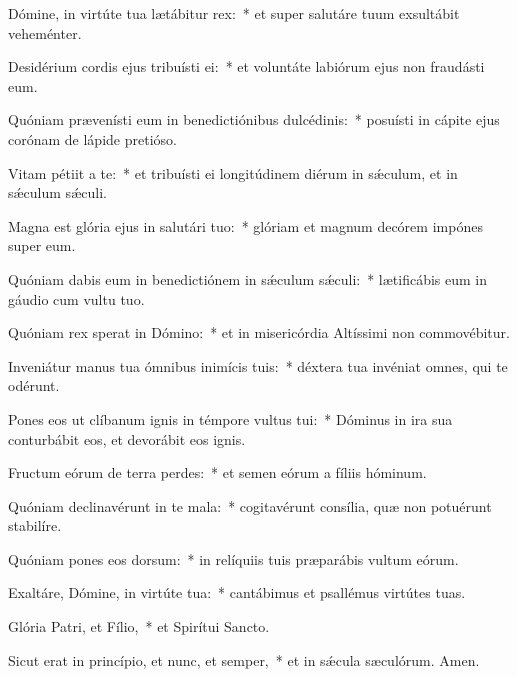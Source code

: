 \item Dómine, in virtúte tua lætábitur rex:~* et super salutáre tuum exsultábit veheménter.

\item Desidérium cordis ejus tribuísti ei:~* et voluntáte labiórum ejus non fraudásti eum.

\item Quóniam prævenísti eum in benedictiónibus dulcédinis:~* posuísti in cápite ejus corónam de lápide pretióso.

\item Vitam pétiit a te:~* et tribuísti ei longitúdinem diérum in sǽculum, et in sǽculum sǽculi.

\item Magna est glória ejus in salutári tuo:~* glóriam et magnum decórem impónes super eum.

\item Quóniam dabis eum in benedictiónem in sǽculum sǽculi:~* lætificábis eum in gáudio cum vultu tuo.

\item Quóniam rex sperat in Dómino:~* et in misericórdia Altíssimi non commovébitur.

\item Inveniátur manus tua ómnibus inimícis tuis:~* déxtera tua invéniat omnes, qui te odérunt.

\item Pones eos ut clíbanum ignis in témpore vultus tui:~* Dóminus in ira sua conturbábit eos, et devorábit eos ignis.

\item Fructum eórum de terra perdes:~* et semen eórum a fíliis hóminum.

\item Quóniam declinavérunt in te mala:~* cogitavérunt consília, quæ non potuérunt stabilíre.

\item Quóniam pones eos dorsum:~* in relíquiis tuis præparábis vultum eórum.

\item Exaltáre, Dómine, in virtúte tua:~* cantábimus et psallémus virtútes tuas.

\item Glória Patri, et Fílio,~* et Spirítui Sancto.

\item Sicut erat in princípio, et nunc, et semper,~* et in sǽcula sæculórum. Amen.

